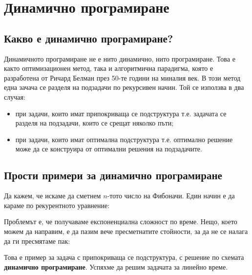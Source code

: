 \chapter{Динамично програмиране}

\section{Какво е динамично програмиране?}

Динамичното програмиране не е нито динамично, нито програмиране.
Това е както оптимизационен метод, така и алгоритмична парадигма, която е разработена от Ричард Белман през 50-те години на миналия век.
В този метод една зачача се разделя на подзадачи по рекурсивен начин.
Той се използва в два случая:
\begin{itemize}
    \item при задачи, които имат припокриваща се подструктура т.е. задачата се разделя на подзадачи, които се срещат няколко пъти;
    \item при задачи, които имат оптимална подструктура т.е. оптимално решение може да се конструира от оптимални решения на подзадачите.
\end{itemize}

\section{Прости примери за динамично програмиране}

Да кажем, че искаме да сметнем $n$-тото число на Фибоначи.
Един начин е да караме по рекурентното уравнение:

Проблемът е, че получаваме експоненциална сложност по време.
Нещо, което можем да направим, е да пазим вече пресметнатите стойности, за да не се налага да ги пресмятаме пак:

Това е пример за задача с припокриваща се подструктура, с решение по схемата \textbf{динамично програмиране}.
Успяхме да решим задачата за линейно време.

